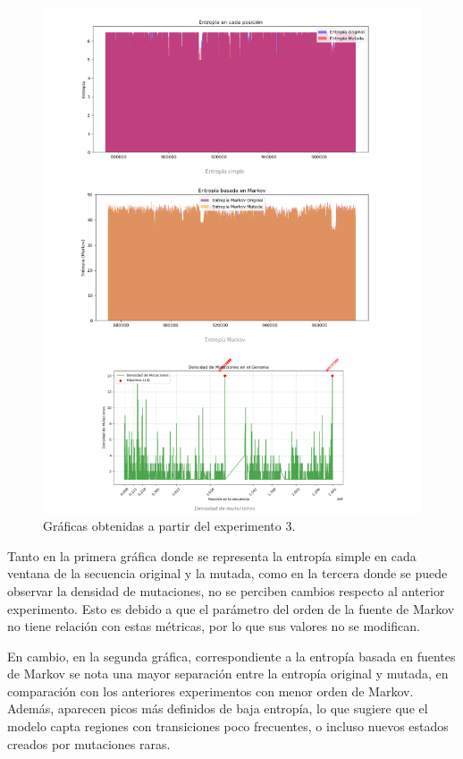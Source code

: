 \documentclass[11pt,spanish,listoffigures,listoftables]{tfgetsinf}
\begin{document}
\begin{figure}[H]
      \centering
      \includegraphics[width=1.0\textwidth]{graf_exp4.png}
      \caption{Gráficas obtenidas a partir del experimento 3.}
      \label{fig:etiqueta_opcional42}
\end{figure}

Tanto en la primera gráfica donde se representa la entropía simple en cada ventana de la secuencia original y la mutada, como en la tercera donde se puede observar la densidad de mutaciones, no se perciben cambios respecto al anterior experimento. Esto es debido a que el parámetro del orden de la fuente de Markov no tiene relación con estas métricas, por lo que sus valores no se modifican.

En cambio, en la segunda gráfica, correspondiente a la entropía basada en fuentes de Markov se nota una mayor separación entre la entropía original y mutada, en comparación con los anteriores experimentos con menor orden de Markov. Además, aparecen picos más definidos de baja entropía, lo que sugiere que el modelo capta regiones con transiciones poco frecuentes, o incluso nuevos estados creados por mutaciones raras.
\end{document}
